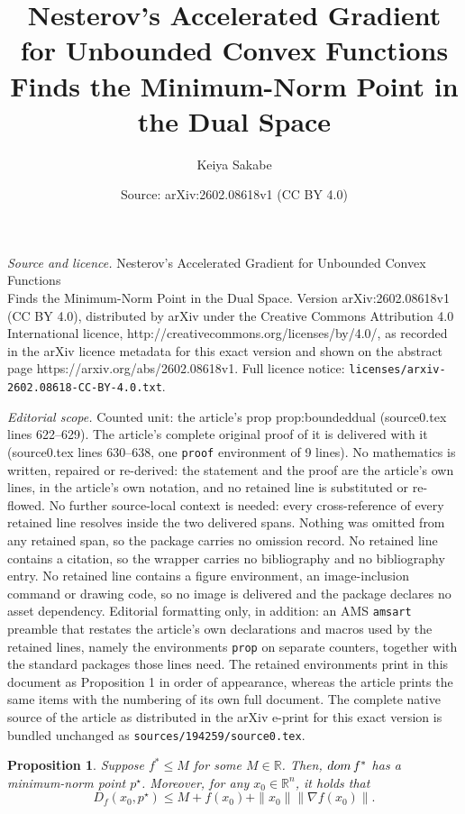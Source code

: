 \documentclass[10pt,a4paper]{amsart}
\title{{\Large Nesterov's Accelerated Gradient for Unbounded Convex Functions\\Finds the Minimum-Norm Point in the Dual Space}}
\author{Keiya Sakabe}
\date{Source: arXiv:2602.08618v1 (CC BY 4.0)}
\newtheorem{prop}{Proposition}
\newcommand{\RR}{{\mathbb{R}}}
\newcommand{\dom}{\mathop{\rm dom}}
\begin{document}
\maketitle

\noindent\emph{Source and licence.} {\Large Nesterov's Accelerated Gradient for Unbounded Convex Functions\\Finds the Minimum-Norm Point in the Dual Space}. Version arXiv:2602.08618v1 (CC BY 4.0), distributed by arXiv under the Creative Commons Attribution 4.0 International licence, http://creativecommons.org/licenses/by/4.0/, as recorded in the arXiv licence metadata for this exact version and shown on the abstract page https://arxiv.org/abs/2602.08618v1. Full licence notice: \texttt{licenses/arxiv-2602.08618-CC-BY-4.0.txt}.\par\smallskip

\noindent\textit{Editorial scope.} Counted unit: the article's prop prop:boundeddual (source0.tex lines 622--629). The article's complete original proof of it is delivered with it (source0.tex lines 630--638, one \texttt{proof} environment of 9 lines). No mathematics is written, repaired or re-derived: the statement and the proof are the article's own lines, in the article's own notation, and no retained line is substituted or re-flowed.  No further source-local context is needed: every cross-reference of every retained line resolves inside the two delivered spans.  Nothing was omitted from any retained span, so the package carries no omission record.  No retained line contains a citation, so the wrapper carries no bibliography and no bibliography entry.  No retained line contains a figure environment, an image-inclusion command or drawing code, so no image is delivered and the package declares no asset dependency.  Editorial formatting only, in addition: an AMS \texttt{amsart} preamble that restates the article's own declarations and macros used by the retained lines, namely the environments \texttt{prop} on separate counters, together with the standard packages those lines need.  The retained environments print in this document as Proposition 1 in order of appearance, whereas the article prints the same items with the numbering of its own full document.  The complete native source of the article as distributed in the arXiv e-print for this exact version is bundled unchanged as \texttt{sources/194259/source0.tex}.
\begin{prop}\label{prop:boundeddual}
    Suppose $f^\ast \le M$ for some $M \in \RR$.
    Then, $\dom f^\ast$ has a minimum-norm point $p^\star$.
    Moreover, for any $x_0 \in \RR^n$, it holds that
    \[
        D_f(x_0, p^\star) \le M + f(x_0) + \|x_0\|\|\nabla f(x_0)\|.
    \]
\end{prop}
\end{document}
